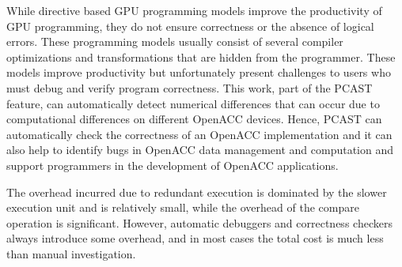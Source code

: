 While directive based GPU programming models improve the productivity of GPU programming, they do not ensure correctness or the absence of logical errors.
These programming models usually consist of several compiler optimizations and transformations that are hidden from the programmer.
These models improve productivity but unfortunately present challenges to users who must debug and verify program correctness.
This work, part of the PCAST feature, can automatically detect numerical differences that can occur due to computational differences on different OpenACC devices.
Hence, PCAST can automatically check the correctness of an OpenACC implementation and it can also help to identify bugs in OpenACC data management and computation and support programmers in the development of OpenACC applications.

The overhead incurred due to redundant execution is dominated by the slower execution unit and is relatively small, while the overhead of the compare operation is significant.
However, automatic debuggers and correctness checkers always introduce some overhead, and in most cases the total cost is much less than manual investigation.
